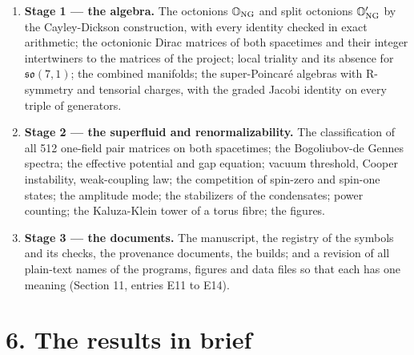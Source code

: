 \documentclass[
  10pt,
]{article}
\providecommand{\tightlist}{%
  \setlength{\itemsep}{0pt}\setlength{\parskip}{0pt}}
\begin{document}
\begin{enumerate}
\def\labelenumi{\arabic{enumi}.}
\tightlist
\item
  \textbf{Stage 1 --- the algebra.} The octonions \(\mathbb O_{\rm NG}\)
  and split octonions \(\mathbb O'_{\rm NG}\) by the Cayley-Dickson
  construction, with every identity checked in exact arithmetic; the
  octonionic Dirac matrices of both spacetimes and their integer
  intertwiners to the matrices of the project; local triality and its
  absence for \(\mathfrak{so}(7,1)\); the combined manifolds; the
  super-Poincaré algebras with R-symmetry and tensorial charges, with
  the graded Jacobi identity on every triple of generators.
\item
  \textbf{Stage 2 --- the superfluid and renormalizability.} The
  classification of all 512 one-field pair matrices on both spacetimes;
  the Bogoliubov-de Gennes spectra; the effective potential and gap
  equation; vacuum threshold, Cooper instability, weak-coupling law; the
  competition of spin-zero and spin-one states; the amplitude mode; the
  stabilizers of the condensates; power counting; the Kaluza-Klein tower
  of a torus fibre; the figures.
\item
  \textbf{Stage 3 --- the documents.} The manuscript, the registry of
  the symbols and its checks, the provenance documents, the builds; and
  a revision of all plain-text names of the programs, figures and data
  files so that each has one meaning (Section 11, entries E11 to E14).
\end{enumerate}

\hypertarget{the-results-in-brief}{%
\section{6. The results in brief}\label{the-results-in-brief}}
\end{document}
